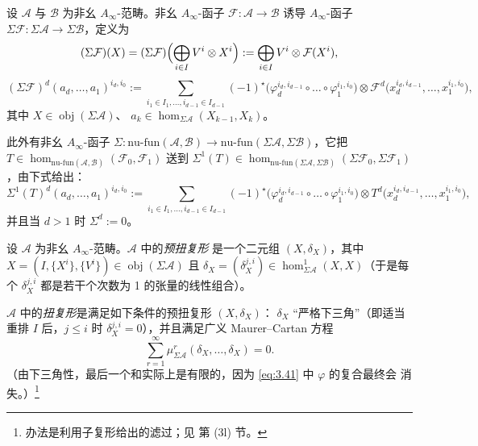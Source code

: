 \begin{Def}\label{def:3.26}
设 $\mathcal A$ 与 $\mathcal B$ 为非幺 $A_\infty$-范畴。非幺 $A_\infty$-函子
$\mathcal F:\mathcal A\to\mathcal B$ 诱导 $A_\infty$-函子
$\Sigma\mathcal F:\Sigma\mathcal A\to\Sigma\mathcal B$，定义为
\begin{equation}\label{eq:3.42}
  (\Sigma\mathcal F)(X)=(\Sigma\mathcal F)\Bigl(\bigoplus_{i\in I}
  V^i\otimes X^i\Bigr):=\bigoplus_{i\in I}V^i\otimes\mathcal F(X^i),
\end{equation}
\[
  (\Sigma\mathcal F)^d(a_d,\dots,a_1)^{i_d,i_0}:=
  \sum_{i_1\in I_1,\dots,i_{d-1}\in I_{d-1}}(-1)^{\star}
  \bigl(\varphi_d^{i_d,i_{d-1}}\circ\dots\circ\varphi_1^{i_1,i_0}\bigr)
  \otimes\mathcal F^d\bigl(x_d^{i_d,i_{d-1}},\dots,x_1^{i_1,i_0}\bigr),
\]
其中 $X\in\operatorname{obj}(\Sigma\mathcal A)$、
$a_k\in\hom_{\Sigma\mathcal A}(X_{k-1},X_k)$。

此外有非幺 $A_\infty$-函子
$\Sigma:\mathrm{nu\text{-}fun}(\mathcal A,\mathcal B)\to
\mathrm{nu\text{-}fun}(\Sigma\mathcal A,\Sigma\mathcal B)$，它把
$T\in\hom_{\mathrm{nu\text{-}fun}(\mathcal A,\mathcal B)}(\mathcal F_0,
\mathcal F_1)$ 送到
$\Sigma^1(T)\in\hom_{\mathrm{nu\text{-}fun}(\Sigma\mathcal A,\Sigma\mathcal B)}
(\Sigma\mathcal F_0,\Sigma\mathcal F_1)$，由下式给出：
\begin{equation}\label{eq:3.43}
  \Sigma^1(T)^d(a_d,\dots,a_1)^{i_d,i_0}:=
  \sum_{i_1\in I_1,\dots,i_{d-1}\in I_{d-1}}(-1)^{\star}
  \bigl(\varphi_d^{i_d,i_{d-1}}\circ\dots\circ\varphi_1^{i_1,i_0}\bigr)
  \otimes T^d\bigl(x_d^{i_d,i_{d-1}},\dots,x_1^{i_1,i_0}\bigr),
\end{equation}
并且当 $d>1$ 时 $\Sigma^d:=0$。
\end{Def}

\begin{Def}\label{def:3.27}
设 $\mathcal A$ 为非幺 $A_\infty$-范畴。$\mathcal A$ 中的\emph{预扭复形}
是一个二元组 $(X,\delta_X)$，其中
$X=(I,\{X^i\},\{V^i\})\in\operatorname{obj}(\Sigma\mathcal A)$ 且
$\delta_X=(\delta_X^{j,i})\in\hom^1_{\Sigma\mathcal A}(X,X)$（于是每个
$\delta_X^{j,i}$ 都是若干个次数为 1 的张量的线性组合）。

$\mathcal A$ 中的\emph{扭复形}是满足如下条件的预扭复形 $(X,\delta_X)$：
$\delta_X$ “严格下三角”（即适当重排 $I$ 后，$j\le i$ 时
$\delta_X^{j,i}=0$），并且满足广义 Maurer–Cartan 方程
\begin{equation}\label{eq:3.44}
  \sum_{r=1}^{\infty}\mu^r_{\Sigma\mathcal A}(\delta_X,\dots,\delta_X)=0.
\end{equation}
（由下三角性，最后一个和实际上是有限的，因为 \eqref{eq:3.41} 中 $\varphi$ 的复合最终会
消失。）\footnote{办法是利用子复形给出的滤过；见 \cite{Sei08} 第 (3l) 节。}
\end{Def}

